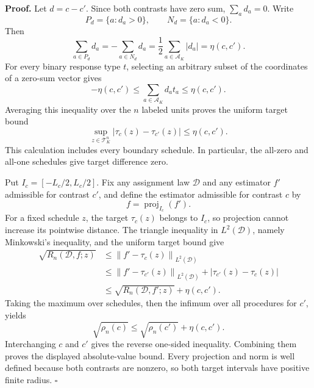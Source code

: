 \textbf{Proof.}
Let \(d=c-c'\).  Since both contrasts have zero sum, \(\sum_a d_a=0\).  Write
\[
 P_d=\{a:d_a>0\},\qquad N_d=\{a:d_a<0\}.
\]
Then
\[
 \sum_{a\in P_d}d_a=-\sum_{a\in N_d}d_a
 =\frac12\sum_{a\in\mathcal A_K}|d_a|=\eta(c,c').
\]
For every binary response type \(t\), selecting an arbitrary subset of the coordinates of a zero-sum vector gives
\[
 -\eta(c,c')\leq\sum_{a\in\mathcal A_K}d_at_a\leq\eta(c,c').
\]
Averaging this inequality over the \(n\) labeled units proves the uniform target bound
\[
 \sup_{z\in\mathcal T_K^n}|\tau_c(z)-\tau_{c'}(z)|
 \leq\eta(c,c').
\]
This calculation includes every boundary schedule.  In particular, the all-zero and all-one schedules give target difference zero.

Put \(I_c=[-L_c/2,L_c/2]\).  Fix any assignment law \(\mathcal D\) and any estimator \(f'\) admissible for contrast \(c'\), and define the estimator admissible for contrast \(c\) by
\[
 f=\operatorname{proj}_{I_c}(f').
\]
For a fixed schedule \(z\), the target \(\tau_c(z)\) belongs to \(I_c\), so projection cannot increase its pointwise distance.  The triangle inequality in \(L^2(\mathcal D)\), namely Minkowski's inequality, and the uniform target bound give
\[
 \begin{aligned}
 \sqrt{R_n(\mathcal D,f;z)}
 &\leq
 \left\|f'-\tau_c(z)\right\|_{L^2(\mathcal D)}\\
 &\leq
 \left\|f'-\tau_{c'}(z)\right\|_{L^2(\mathcal D)}
 +|\tau_{c'}(z)-\tau_c(z)|\\
 &\leq \sqrt{R_n(\mathcal D,f';z)}+\eta(c,c').
 \end{aligned}
\]
Taking the maximum over schedules, then the infimum over all procedures for \(c'\), yields
\[
 \sqrt{\rho_n(c)}\leq\sqrt{\rho_n(c')}+\eta(c,c').
\]
Interchanging \(c\) and \(c'\) gives the reverse one-sided inequality.  Combining them proves the displayed absolute-value bound.  Every projection and norm is well defined because both contrasts are nonzero, so both target intervals have positive finite radius. \(\square\)